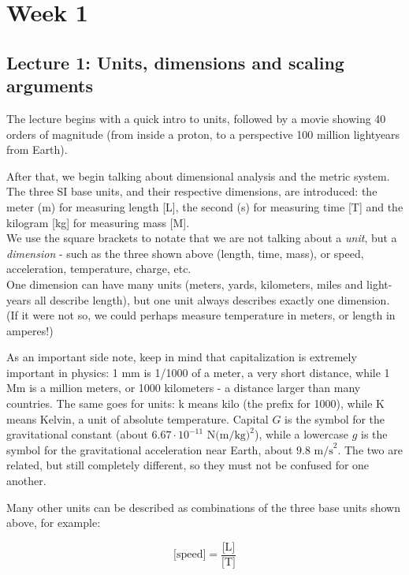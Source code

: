 \documentclass[8.01x]{subfiles}
\begin{document}
\chapter{Week 1}

\section{Lecture 1: Units, dimensions and scaling arguments}

The lecture begins with a quick intro to units, followed by a movie showing 40 orders of magnitude (from inside a proton, to a perspective 100 million lightyears from Earth).

After that, we begin talking about dimensional analysis and the metric system.
The three SI base units, and their respective dimensions, are introduced: the meter (m) for measuring length [L], the second (s) for measuring time [T] and the kilogram [kg] for measuring mass [M].\\
We use the square brackets to notate that we are not talking about a \emph{unit}, but a \emph{dimension} - such as the three shown above (length, time, mass), or speed, acceleration, temperature, charge, etc.\\
One dimension can have many units (meters, yards, kilometers, miles and light-years all describe length), but one unit always describes exactly one dimension. (If it were not so, we could perhaps measure temperature in meters, or length in amperes!)

As an important side note, keep in mind that capitalization is extremely important in physics: 1 mm is 1/1000 of a meter, a very short distance, while 1 Mm is a million meters, or 1000 kilometers - a distance larger than many countries. The same goes for units: k means kilo (the prefix for 1000), while K means Kelvin, a unit of absolute temperature. Capital $G$ is the symbol for the gravitational constant (about $6.67 \cdot 10^{-11} \text{ N(m/kg)}^2$), while a lowercase $g$ is the symbol for the gravitational acceleration near Earth, about $9.8 \text{ m/s}^2$. The two are related, but still completely different, so they must not be confused for one another.

Many other units can be described as combinations of the three base units shown above, for example:

\begin{equation}
 \text{[speed]} = \frac{\text{[L]}}{\text{[T]}}
\end{equation}
\end{document}
